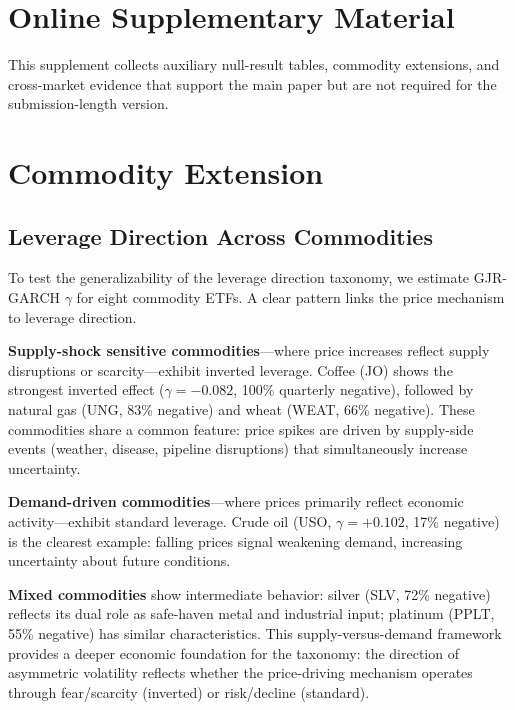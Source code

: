 \section*{Online Supplementary Material}

This supplement collects auxiliary null-result tables, commodity extensions, and cross-market evidence that support the main paper but are not required for the submission-length version.




\appendix

\section{Commodity Extension}

\subsection{Leverage Direction Across Commodities}

To test the generalizability of the leverage direction taxonomy, we estimate GJR-GARCH $\gamma$ for eight commodity ETFs. A clear pattern links the price mechanism to leverage direction.

\textbf{Supply-shock sensitive commodities}---where price increases reflect supply disruptions or scarcity---exhibit inverted leverage. Coffee (JO) shows the strongest inverted effect ($\gamma = -0.082$, 100\% quarterly negative), followed by natural gas (UNG, 83\% negative) and wheat (WEAT, 66\% negative). These commodities share a common feature: price spikes are driven by supply-side events (weather, disease, pipeline disruptions) that simultaneously increase uncertainty.

\textbf{Demand-driven commodities}---where prices primarily reflect economic activity---exhibit standard leverage. Crude oil (USO, $\gamma = +0.102$, 17\% negative) is the clearest example: falling prices signal weakening demand, increasing uncertainty about future conditions.

\textbf{Mixed commodities} show intermediate behavior: silver (SLV, 72\% negative) reflects its dual role as safe-haven metal and industrial input; platinum (PPLT, 55\% negative) has similar characteristics. This supply-versus-demand framework provides a deeper economic foundation for the taxonomy: the direction of asymmetric volatility reflects whether the price-driving mechanism operates through fear/scarcity (inverted) or risk/decline (standard).

